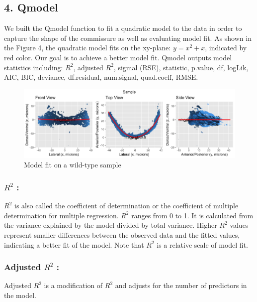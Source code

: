 \documentclass[10pt,letterpaper]{article}
\begin{document}
\hypertarget{qmodel}{%
\subsection{4. Qmodel}\label{qmodel}}

We built the Qmodel function to fit a quadratic model to the data in
order to capture the shape of the commissure as well as evaluating model
fit. As shown in the Figure 4, the quadratic model fits on the xy-plane:
\(y=x^2+x\), indicated by red color. Our goal is to achieve a better
model fit. Qmodel outputs model statistics including: \(R^2\), adjusted
\(R^2\), sigmal (RSE), statistic, p.value, df, logLik, AIC, BIC,
deviance, df.residual, num.signal, quad.coeff, RMSE.

\begin{figure}[H]
\includegraphics[width=1\linewidth]{visualization_paper/wt_04_model} \caption{Model fit on a wild-type sample}\label{fig:Figure4}
\end{figure}

\hypertarget{r2}{%
\subsubsection{\texorpdfstring{\(R^2\) :}{R\^{}2 :}}\label{r2}}

\(R^2\) is also called the coefficient of determination or the
coefficient of multiple determination for multiple regression. \(R^2\)
ranges from 0 to 1. It is calculated from the variance explained by the
model divided by total variance. Higher \(R^2\) values represent smaller
differences between the observed data and the fitted values, indicating
a better fit of the model. Note that \(R^2\) is a relative scale of
model fit.

\hypertarget{adjusted-r2}{%
\subsubsection{\texorpdfstring{Adjusted \(R^2\)
:}{Adjusted R\^{}2 :}}\label{adjusted-r2}}

Adjusted \(R^2\) is a modification of \(R^2\) and adjusts for the number
of predictors in the model.
\end{document}
